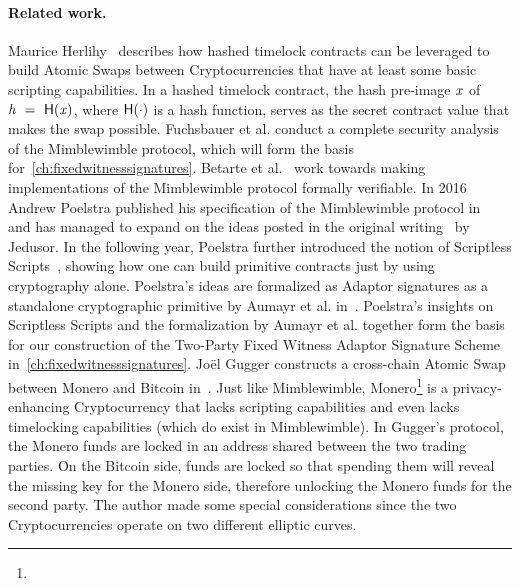 \paragraph{Related work.} Maurice Herlihy~\cite{herlihy2018atomic} describes how hashed timelock contracts can be leveraged to build Atomic Swaps between Cryptocurrencies that have at least some basic scripting capabilities.
In a hashed timelock contract, the hash pre-image $\mathit{x}$ of $\mathit{h} ~=~ \mathsf{H} (\mathit{x})$, where $\mathsf{H} (\cdot)$ is a hash function, serves as the secret contract value that makes the swap possible.
Fuchsbauer et al. conduct a complete security analysis of the Mimblewimble protocol, which will form the basis for~\cref{ch:fixedwitnesssignatures}.
Betarte et al.~\cite{betarte2019towards} work towards making implementations of the Mimblewimble protocol formally verifiable.
In 2016 Andrew Poelstra published his specification of the Mimblewimble protocol in~\cite{poelstra2016mimblewimble} and has managed to expand on the ideas posted in the original writing~\cite{jedusor2016mimblewimble} by Jedusor.
In the following year, Poelstra further introduced the notion of Scriptless Scripts~\cite{poelstra2017scriptless}, showing how one can build primitive contracts just by using cryptography alone.
Poelstra's ideas are formalized as Adaptor signatures as a standalone cryptographic primitive by Aumayr et al. in~\cite{aumayr2020bitcoinchannels}.
Poelstra's insights on Scriptless Scripts and the formalization by Aumayr et al. together form the basis for our construction of the Two-Party Fixed Witness Adaptor Signature Scheme in~\cref{ch:fixedwitnesssignatures}.
Joël Gugger constructs a cross-chain Atomic Swap between Monero and Bitcoin in~\cite{gugger2020bitcoin}.
Just like Mimblewimble, Monero\footnote{\urlmonero} is a privacy-enhancing Cryptocurrency that lacks scripting capabilities and even lacks timelocking capabilities (which do exist in Mimblewimble).
In Gugger's protocol, the Monero funds are locked in an address shared between the two trading parties.
On the Bitcoin side, funds are locked so that spending them will reveal the missing key for the Monero side, therefore unlocking the Monero funds for the second party.
The author made some special considerations since the two Cryptocurrencies operate on two different elliptic curves.